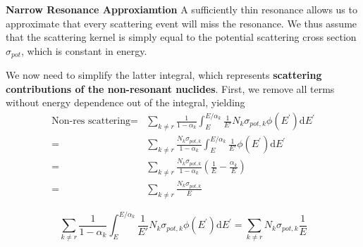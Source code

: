 \documentclass{beamer}
\begin{document}
\begin{frame}
  \textbf{Narrow Resonance Approxiamtion}
  A sufficiently thin resonance allows us to approximate that every scattering event will miss the resonance. We thus assume that the scattering kernel is simply equal to the potential scattering cross section $\sigma_{pot}$, which is constant in energy.
\end{frame}




\begin{frame}
  
We now need to simplify the latter integral, which represents \textbf{scattering contributions of the non-resonant nuclides}. First, we remove all terms without energy dependence out of the integral, yielding
  \begin{align*}\mbox{Non-res scattering}=&\sum\limits_{k\neq r}\frac{1}{1-\alpha_{k}}\int_{E}^{E/\alpha_{k}}\frac{1}{E'}N_{k}\sigma_{pot,k}\phi\left(E^{\prime}\right)\mathrm{d}E^{\prime} \\=&\sum\limits_{k\neq r}\frac{N_{k}\sigma_{pot,k}}{1-\alpha_{k}}\int_{E}^{E/\alpha_{k}}\frac{1}{E'}\phi\left(E^{\prime}\right)\mathrm{d}E^{\prime}
  \\= &\sum\limits_{k\neq r}\frac{N_{k}\sigma_{pot,k}}{1-\alpha_{k}}\left(\frac{1}{E}-\frac{\alpha_k}{E}\right)
  \\= &\sum\limits_{k\neq r}\frac{N_{k}\sigma_{pot,k}}{E}
\end{align*}

  \begin{equation*}\boxed{\sum\limits_{k\neq r}\frac{1}{1-\alpha_{k}}\int_{E}^{E/\alpha_{k}}\frac{1}{E'}N_{k}\sigma_{pot,k}\phi\left(E^{\prime}\right)\mathrm{d}E^{\prime}=\sum\limits_{k\neq r}N_{k}\sigma_{pot,k}\frac{1}{E}}\label{eq:NR-mainConclusion1}\end{equation*}
\end{frame}
\end{document}
